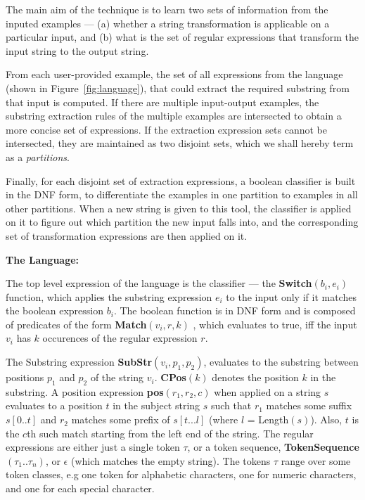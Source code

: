 The main aim of the technique is to learn two sets of information from the inputed examples --- (a) whether a string transformation is applicable on a particular input, and (b) what is the set of regular expressions that transform the input string to the output string.

From each user-provided example, the set of all expressions from the language (shown in Figure~\ref{fig:language}), that could extract the required substring from that input is computed. If there are multiple input-output examples, the substring extraction rules of the multiple examples are intersected to obtain a more concise set of expressions. If the extraction expression sets cannot be intersected, they are maintained as two disjoint sets, which we shall hereby term as a {\it partitions}. 

Finally, for each disjoint set of extraction expressions, a boolean classifier is built in the DNF form, to differentiate the examples in one partition to examples in all other partitions. When a new string is given to this tool, the classifier is applied on it to figure out which partition the new input falls into, and the corresponding set of transformation expressions are then applied on it.

{\bf The Language:}

The top level expression of the language is the classifier --- the {\bf Switch}$(b_i,e_i)$ function, which applies the substring expression $e_i$ to the input only if it matches the boolean expression $b_i$. The boolean function is in DNF form and is composed of predicates of the form {\bf Match}$(v_i,r,k)$ , which evaluates to true, iff the input $v_i$ has $k$ occurences of the regular expression $r$.

The Substring expression {\bf SubStr}$(v_i,p_1,p_2)$, evaluates to the substring between positions $p_1$ and $p_2$ of the string $v_i$. {\bf CPos}$(k)$ denotes the position $k$ in the substring. A position expression {\bf pos}$(r_1,r_2,c)$ when applied on a string $s$ evaluates to a position $t$ in the subject string $s$ such that $r_1$ matches some suffix $s[0 ..t]$ and $r_2$ matches some prefix of $s[t ... l]$ (where $l$ = Length$(s)$). Also, $t$ is the $c$th such match starting from the left end of the string. The regular expressions are either just a single token $\tau$, or a token sequence, {\bf TokenSequence}$(\tau_1 .. \tau_n)$, or $\epsilon$ (which matches the empty string). The tokens $\tau$ range over some token classes, e.g one token for alphabetic characters, one for numeric characters, and one for each special character. 

